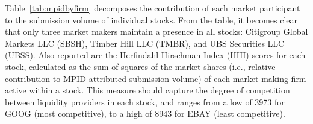 \documentclass{article}
\begin{document}
\noindent Table~\ref{tab:mpidbyfirm} decomposes the contribution of each market participant to the submission volume of individual stocks. From the table, it becomes clear that only three market makers maintain a presence in all stocks: Citigroup Global Markets LLC (SBSH), Timber Hill LLC (TMBR), and UBS Securities LLC (UBSS). Also reported are the Herfindahl-Hirschman Index (HHI) scores for each stock, calculated as the sum of squares of the market shares (i.e., relative contribution to MPID-attributed submission volume) of each market making firm active within a stock. This measure should capture the degree of competition between liquidity providers in each stock, and ranges from a low of 3973 for GOOG (most competitive), to a high of 8943 for EBAY (least competitive).

\begin{table}[!htbp]
\caption{Relative Contribution of Market Participants to Submission Volume, By Stock}\label{tab:mpidbyfirm}
\begin{center}
\end{center}
\end{table}
\end{document}
